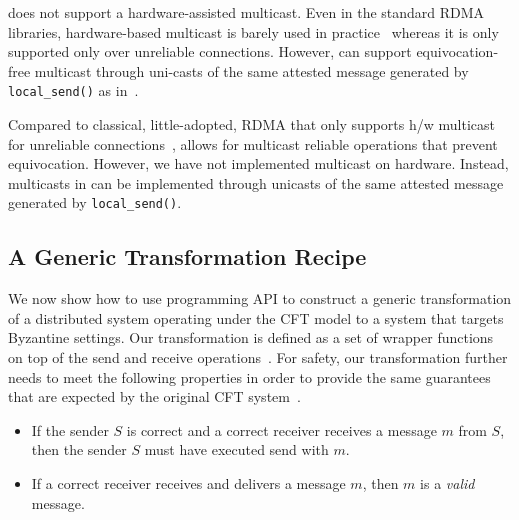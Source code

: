 
\projecttitle{} does not support a hardware-assisted multicast. Even in the standard RDMA libraries, hardware-based multicast is barely used in practice~\cite{f04eb9b864204bab958e72055062748c} whereas it is only supported only over unreliable connections. However, \projecttitle{} can support equivocation-free multicast through uni-casts of the same attested message generated by {\tt local\_send()} as in~\cite{levin2009trinc}.

Compared to classical, little-adopted, RDMA that only supports h/w multicast for unreliable connections~\cite{f04eb9b864204bab958e72055062748c}, \projecttitle{} allows for multicast reliable operations that prevent equivocation. However, we have not implemented multicast on hardware. Instead, multicasts in \projecttitle{} can be implemented through unicasts of the same attested message generated by {\tt local\_send()}.
\fi






\subsection{A Generic Transformation Recipe}
\label{subsec:transformation}
 We now show how to use \projecttitle{} programming API to construct a generic transformation of a distributed system operating under the CFT model to a system that targets Byzantine settings.  Our transformation is defined as a set of wrapper functions on top of the send and receive operations~\cite{clement2012}. For safety, our transformation further needs to meet the following properties in order to provide the same guarantees that are expected by the original CFT system~\cite{clement2012, making_distributed_app_rob, 268272}.

\begin{itemize}
    \item {} If the sender $S$ is correct and a correct receiver receives a message $m$ from $S$, then the sender $S$ must have executed send with $m$.
    \item {} If a correct receiver receives and delivers a message $m$, then $m$ is a {\em valid} message.
\end{itemize}

